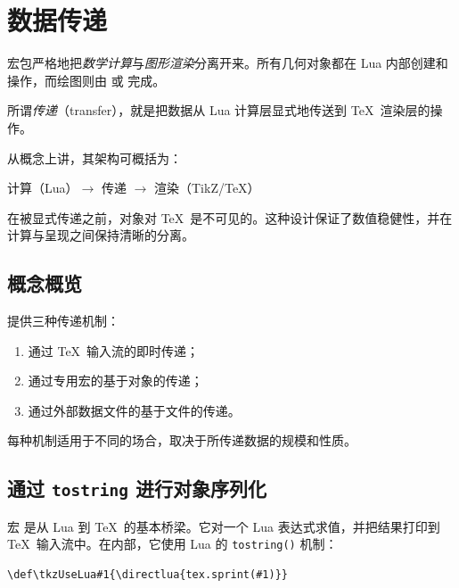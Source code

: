 \newpage
\section{数据传递}
\label{sec:transfers}

 宏包严格地把\emph{数学计算}与\emph{图形渲染}分离开来。所有几何对象都在 Lua 内部创建和操作，而绘图则由  或  完成。

所谓\emph{传递}（transfer），就是把数据从 Lua 计算层显式地传送到 \TeX\ 渲染层的操作。

\medskip
从概念上讲，其架构可概括为：

\begin{center}
计算（Lua）$\longrightarrow$ 传递 $\longrightarrow$ 渲染（TikZ/\TeX）
\end{center}

在被显式传递之前，对象对 \TeX\ 是不可见的。这种设计保证了数值稳健性，并在计算与呈现之间保持清晰的分离。

\subsection{概念概览}

 提供三种传递机制：

\begin{enumerate}
\item 通过 \TeX\ 输入流的即时传递；
\item 通过专用宏的基于对象的传递；
\item 通过外部数据文件的基于文件的传递。
\end{enumerate}

每种机制适用于不同的场合，取决于所传递数据的规模和性质。

\subsection{通过 \texttt{tostring} 进行对象序列化}
\label{subsec:transfers_tostring}

宏  是从 Lua 到 \TeX\ 的基本桥梁。它对一个 Lua 表达式求值，并把结果打印到 \TeX\ 输入流中。在内部，它使用 Lua 的 \texttt{tostring()} 机制：

\begin{verbatim}
\def\tkzUseLua#1{\directlua{tex.sprint(#1)}}
\end{verbatim}

